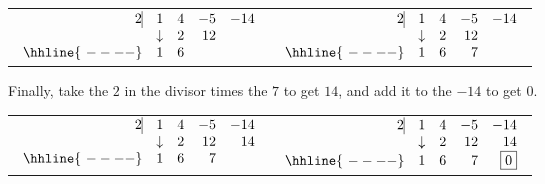 \documentclass{ximera}
\begin{document}
\begin{center}
    \begin{tabular}{cc}
        $ \begin{array}{rrrrr}
            2   \vline& 1 & 4 & -5  & -14 \\
            & \downarrow &  2  &  12  &  \\ \hhline{~----} 
            & 1  &   6  &   &    \\  
        \end{array}$ \hspace{1in}
        &
        $ \begin{array}{rrrrr}
            2   \vline& 1 & 4 & -5  & -14 \\
            & \downarrow &  2  &  12  &  \\ \hhline{~----} 
            & 1  &   6  & 7  &    \\  
        \end{array}$ \\
    \end{tabular}
\end{center}


Finally, take the $2$ in the divisor times the $7$ to get $14$, and add it to the $-14$ to get $0$.

\begin{center}
    \begin{tabular}{cc}
        $ \begin{array}{rrrrr}
            2   \vline& 1 & 4 & -5  & -14 \\
            & \downarrow &  2  &  12  & 14 \\ \hhline{~----} 
            & 1  &   6  & 7  &    \\  
        \end{array}$ \hspace{1in} 
        &
        $ \begin{array}{rrrrr}
            2   \vline& 1 & 4 & -5  & -14 \\
            & \downarrow &  2  &  12  & 14 \\ \hhline{~----} 
            & 1  &   6  & 7  &  \fbox{$0$}  \\  
        \end{array}$ \\
    \end{tabular}
\end{center}
\end{document}
